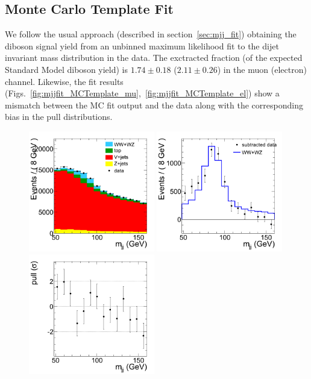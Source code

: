 \subsection{Monte Carlo Template Fit}

We follow the usual approach (described in section~\ref{sec:mjj_fit}) obtaining the diboson signal yield from an unbinned maximum
likelihood fit to the dijet invariant mass distribution in the data. The exctracted fraction (of the expected Standard Model diboson yield) is $1.74\pm 0.18$ ($2.11\pm 0.26$) in the muon (electron) channel. Likewise, the fit results (Figs.~\ref{fig:mjjfit_MCTemplate_mu},~\ref{fig:mjjfit_MCTemplate_el}) show a mismatch between the MC fit output and the data along with the corresponding bias in the pull distributions.

\begin{figure}[h!]
  {\centering
    \includegraphics[width=0.49\textwidth]{figs/mjjfit/DibosonMCTemplatelnujj_muon_Stacked.png}
    \includegraphics[width=0.49\textwidth]{figs/mjjfit/DibosonMCTemplatelnujj_muon_Subtracted.png}
    \includegraphics[width=0.49\textwidth]{figs/mjjfit/DibosonMCTemplatelnujj_muon_Pull.png}
}
\end{figure}
